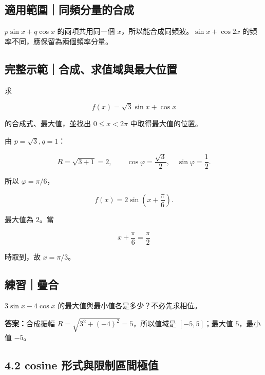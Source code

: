 \documentclass[11pt,a4paper]{article}
\begin{document}
\subsection{適用範圍｜同頻分量的合成}\label{ux9069ux7528ux7bc4ux570dux540cux983bux5206ux91cfux7684ux5408ux6210}

\(p\sin x+q\cos x\) 的兩項共用同一個 \(x\)，所以能合成同頻波。\(\sin x+\cos2x\) 的頻率不同，應保留為兩個頻率分量。

\begin{HandoutWorkedExample}

\subsection{完整示範｜合成、求值域與最大位置}\label{ux5b8cux6574ux793aux7bc4ux5408ux6210ux6c42ux503cux57dfux8207ux6700ux5927ux4f4dux7f6e}

求

\[
f(x)=\sqrt3\sin x+\cos x
\]

的合成式、最大值，並找出 \(0\le x<2\pi\) 中取得最大值的位置。

由 \(p=\sqrt3,q=1\)：

\[
R=\sqrt{3+1}=2,
\qquad
\cos\varphi=\frac{\sqrt3}{2},
\quad
\sin\varphi=\frac12.
\]

所以 \(\varphi=\pi/6\)，

\[
f(x)=2\sin\left(x+\frac\pi6\right).
\]

最大值為 \(2\)。當

\[
x+\frac\pi6=\frac\pi2
\]

時取到，故 \(x=\pi/3\)。

\end{HandoutWorkedExample}

\begin{HandoutSelfCheck}

\subsection{練習｜疊合}\label{ux7df4ux7fd2ux758aux5408}

\(3\sin x-4\cos x\) 的最大值與最小值各是多少？不必先求相位。

\textbf{答案：}合成振幅 \(R=\sqrt{3^2+(-4)^2}=5\)，所以值域是 \([-5,5]\)；最大值 \(5\)，最小值 \(-5\)。

\end{HandoutSelfCheck}

\subsection{4.2 cosine 形式與限制區間極值}\label{cosine-ux5f62ux5f0fux8207ux9650ux5236ux5340ux9593ux6975ux503c}
\end{document}
